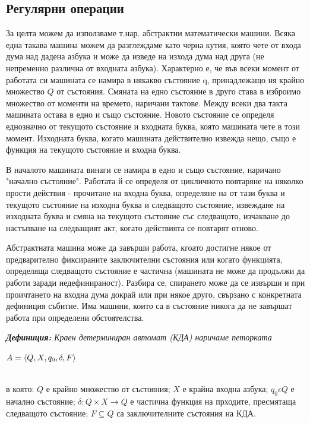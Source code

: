 \documentclass[11pt]{article} %
\begin{document}
\subsection{Регулярни операции}
За целта можем да използваме т.нар. абстрактни математически машини. Всяка една такава машина можем да разглеждаме като черна кутия, която чете от входа дума над дадена азбука и може да изведе на изхода дума над друга (не непременно различна от входната азбука). Характерно е, че във всеки момент от работата си машината се намира в някакво състояние q, принадлежащо ня крайно множество $Q$ от състояния. Смяната на едно състояние в друго става в изброимо множество от моменти на времето, наричани тактове. Между всеки два такта машината остава в едно и също състояние. Новото състояние се определя еднозначно от текущото състояние и входната буква, която машината чете в този момент. Изходната буква, когато машината действително извежда нещо, също е функция на текущото състояние и входна буква. \par

В началото машината винаги се намира в едно и също състояние, наричано "начално състояние". Работата й се определя от цикличното повтаряне на няколко прости действия - прочитане на входна буква, определяне на от тази буква и текущото състояние на изходна буква и следващото състояние, извеждане на изходната буква и смяна на текущото състояние със следващото, изчакване до настъпване на следващият акт, когато действията се повтарят отново. \par

Абстрактната машина може да завърши работа, кгоато достигне някое от предварително фиксираните заключителни състояния или когато функцията, определяща следващото състояние е частична (машината не може да продължи да работи заради недефинираност). Разбира се, спирането може да се извърши и при проичтането на входна дума докрай или при някое друго, свързано с конкретната дефиниция събитие. Има машини, които са в състояние никога да не завършат работа при определени обстоятелства. \par 

\textbf{\emph{Дефиниция:}} \emph{Краен детерминиран автомат (КДА) наричаме петорката} \\
\centerline{$A = \left\langle Q, X, q_{0}, \delta, F \right\rangle$}\\
в която: $Q$ е крайно множество от състояния; $X$ е крайна входна азбука; $q_{0} \epsilon Q$ е начално състояние; 
$\delta : Q \times X \to Q$ е частична функция на прходите, пресмятаща следващото състояние; $F \subseteq Q$ са заключителните състояния на КДА. \par
\end{document}
